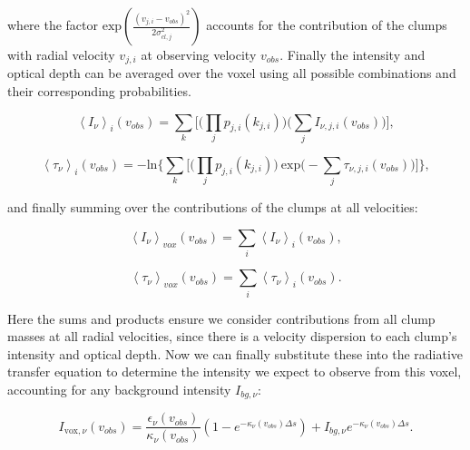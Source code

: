 \documentclass[a4paper]{article}
\begin{document}
    where the factor \(\mathrm{exp}(\frac{(v_{j,i} - v_{obs})^2}{2 \sigma_{cl, j}^2})\) accounts for the contribution of the clumps with radial velocity \(v_{j,i}\) at observing velocity \(v_{obs}\).
    Finally the intensity and optical depth can be averaged over the voxel using all possible combinations and their corresponding probabilities.

    \begin{equation}
    \label{velocity-dependent averaged intensity}
    \left< I_\nu \right>_{i} (v_{obs}) = \sum_k \bigg[ \Big( \prod_j p_{j,i}(k_{j,i}) \Big) \Big( \sum_j I_{\nu,j,i} (v_{obs}) \Big) \bigg],
    \end{equation}

    \begin{equation}
    \label{velocity-dependent averaged optical depth}
    \left< \tau_\nu \right>_{i} (v_{obs}) = -\mathrm{ln} \Bigg\{ \sum_k \bigg[ \Big( \prod_j p_{j,i}(k_{j,i}) \Big) \ \mathrm{exp} \Big( - \sum_j \tau_{\nu,j,i} (v_{obs}) \Big) \bigg] \Bigg\},
    \end{equation}

    and finally summing over the contributions of the clumps at all velocities:

    \begin{equation}
    \label{voxel-averaged intensity}
    \left< I_\nu \right>_{vox} (v_{obs}) = \sum_i \left< I_\nu \right>_{i} (v_{obs}),
    \end{equation}

    \begin{equation}
    \label{voxel-averaged optical depth}
    \left< \tau_\nu \right>_{vox} (v_{obs}) = \sum_i \left< \tau_\nu \right>_{i} (v_{obs}).
    \end{equation}

    Here the sums and products ensure we consider contributions from all clump masses at all radial velocities, since there is a velocity dispersion to each clump's intensity and optical depth.
    Now we can finally substitute these into the radiative transfer equation to determine the intensity we expect to observe from this voxel, accounting for any background intensity \(I_{bg, \nu}\):

    \begin{equation}
    \label{voxel intensity}
    I_{\mathrm{vox},\nu} (v_{obs}) = \frac{\epsilon_\nu (v_{obs})}{\kappa_\nu (v_{obs})} \left( 1 - e^{-\kappa_\nu (v_{obs}) \Delta s} \right) + I_{bg, \nu} e^{-\kappa_\nu (v_{obs}) \Delta s}.
    \end{equation}
\end{document}
